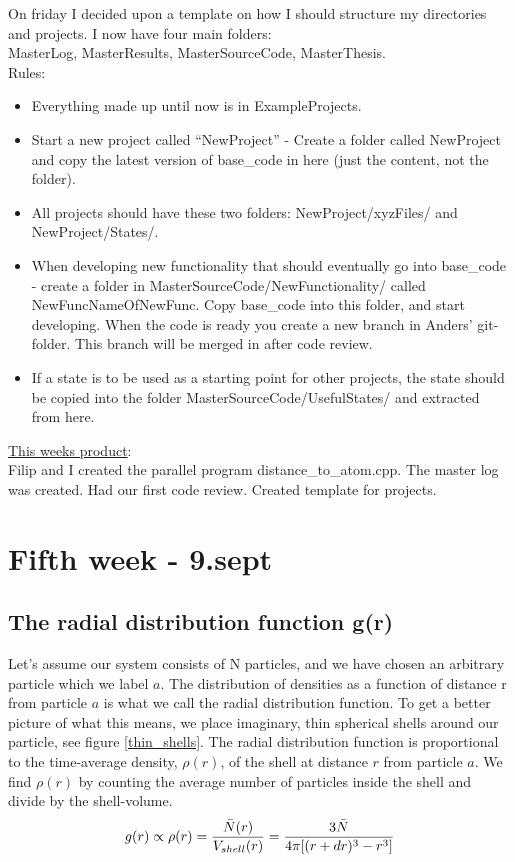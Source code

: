 On friday I decided upon a template on how I should structure my directories and projects. I now have four main folders:\\
MasterLog, MasterResults, MasterSourceCode, MasterThesis. \\
Rules:\\
\begin{itemize}
 \item Everything made up until now is in ExampleProjects.
 \item Start a new project called ``NewProject'' - Create a folder called NewProject and copy the latest version of base\_code in here (just the content, not the folder).
 \item All projects should have these two folders: NewProject/xyzFiles/ and NewProject/States/.
 \item When developing new functionality that should eventually go into base\_code - create a folder in MasterSourceCode/NewFunctionality/ called NewFuncNameOfNewFunc. Copy base\_code into this folder, and start developing. When the code is ready you create a new branch in Anders' git-folder. This branch will be merged in after code review.
 \item If a state is to be used as a starting point for other projects, the state should be copied into the folder MasterSourceCode/UsefulStates/ and extracted from here.
\end{itemize}

\begin{framed}
\underline{This weeks product}:\\
Filip and I created the parallel program distance\_to\_atom.cpp. The master log was created. Had our first code review. Created template for projects. 
\end{framed}
\section{Fifth week - 9.sept}
\subsection{The radial distribution function g(r)}
Let's assume our system consists of N particles, and we have chosen an arbitrary particle which we label $a$. The distribution of densities as a function of distance r from particle $a$ is what we call the radial distribution function. To get a better picture of what this means, we place imaginary, thin spherical shells around our particle, see figure \ref{thin_shells}. The radial distribution function is proportional to the time-average density, $\rho(r)$,  of the shell at distance $r$ from particle $a$. We find $\rho(r)$ by counting the average number of particles inside the shell and divide by the shell-volume.
\begin{align}
 g(r) \propto \rho(r) = \frac{\bar{N}(r)}{V_{shell}(r)} = \frac{3\bar{N}}{4\pi[(r+dr)^3-r^3]}
\end{align}


